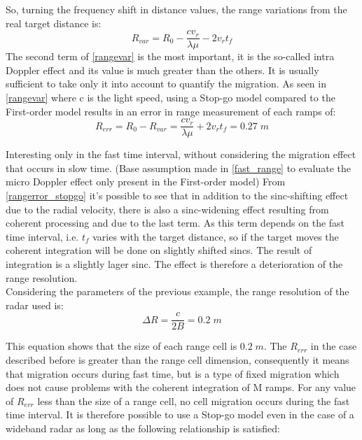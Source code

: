So, turning the frequency shift in distance values, the range variations from the real target distance is: 
\begin{equation}
    R_{var} = R_0 - \frac{c v_{r}}{\lambda \mu} -2v_r t_f
    \label{rangevar}
\end{equation} 
The second term of \ref{rangevar} is the most important, it is the so-called intra Doppler effect and its value is much greater than the others. It is usually sufficient to take only it into account to quantify the migration.
As seen in \ref{rangevar} where c is the light speed, using a Stop-go model compared to the First-order model results in an error in range measurement of each ramps of: 
\begin{equation}
    R_{err} = R_0 - R_{var} = \frac{c v_{r}}{\lambda \mu} + 2v_r t_f = 0.27\; m
    \label{rangerror_stopgo}
\end{equation} 

Interesting only in the fast time interval, without considering the migration effect that occurs in slow time. (Base assumption made in \ref{fast_range} to evaluate the micro Doppler effect only present in the First-order model)
From \ref{rangerror_stopgo} it's possible to see that in addition to the sinc-shifting effect due to the radial velocity, there is also a sinc-widening effect resulting from coherent processing and due to the last term. 
As this term depends on the fast time interval, i.e. $t_{f}$ varies with the target distance, so if the target moves the coherent integration will be done on slightly shifted sincs. The result of integration is a slightly lager sinc.
The effect is therefore a deterioration of the range resolution.\\ Considering the parameters of the previous example, the range resolution of the radar used is:
\begin{equation}
    \Delta R = \frac{c}{2B} = 0.2\; m
    \label{resolutionex}
\end{equation}

This equation shows that the size of each range cell is $ 0.2\; m$. The $R_{err}$ in the case described before is greater than the range cell dimension, consequently it means that migration occurs during fast time, but is a type of fixed migration which does not cause problems with the coherent integration of M ramps. For any value of $R_{err}$ less than the size of a range cell, no cell migration occurs during the fast time interval. It is therefore possible to use a Stop-go model even in the case of a wideband radar as long as the following relationship is satisfied:

